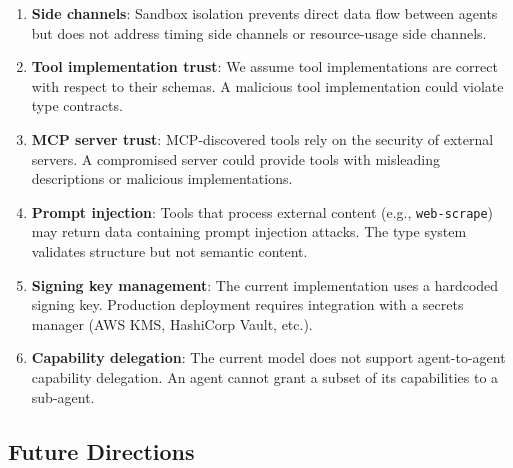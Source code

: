\documentclass[12pt,a4paper]{article}
\theoremstyle{plain}
\theoremstyle{definition}
\begin{document}
\begin{enumerate}[leftmargin=2em]
\item \textbf{Side channels}: Sandbox isolation prevents direct data flow between agents but does not address timing side channels or resource-usage side channels.

\item \textbf{Tool implementation trust}: We assume tool implementations are correct with respect to their schemas. A malicious tool implementation could violate type contracts.

\item \textbf{MCP server trust}: MCP-discovered tools rely on the security of external servers. A compromised server could provide tools with misleading descriptions or malicious implementations.

\item \textbf{Prompt injection}: Tools that process external content (e.g., \texttt{web-scrape}) may return data containing prompt injection attacks. The type system validates structure but not semantic content.

\item \textbf{Signing key management}: The current implementation uses a hardcoded signing key. Production deployment requires integration with a secrets manager (AWS KMS, HashiCorp Vault, etc.).

\item \textbf{Capability delegation}: The current model does not support agent-to-agent capability delegation. An agent cannot grant a subset of its capabilities to a sub-agent.
\end{enumerate}

\subsection{Future Directions}
\end{document}
